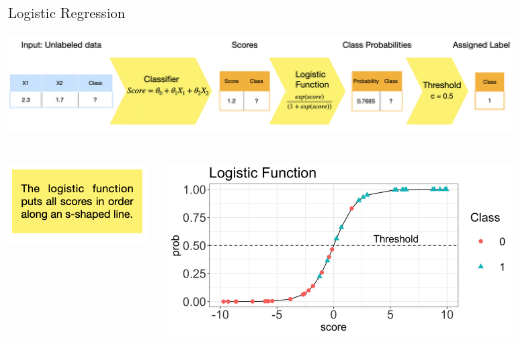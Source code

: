 \documentclass[11pt,compress,t,notes=noshow, xcolor=table]{beamer}
\begin{document}
\begin{vbframe}{Logistic Regression}
\begin{center}
  \includegraphics[width = 1\textwidth]{figure_man/nutshell-classif-logistic-regression}
\end{center}
\begin{columns}
\begin{column}{0.35\textwidth}
\begin{center}
\includegraphics[width=\textwidth]{figure_man/nutshell-classification-text-box-logisticreg}
\end{center}
\end{column}
\begin{column}{0.6\textwidth}
\begin{center}
  \includegraphics[width=1\textwidth]{figure/nutshell_classif_logistic_function}
\end{center}
\end{column}
\end{columns}



\end{vbframe}
\end{document}
